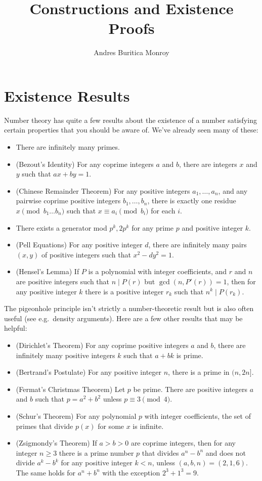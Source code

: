 \documentclass{article}
\title{Constructions and Existence Proofs}
\author{Andres Buritica Monroy}
\date{}
\begin{document}
\maketitle
\section{Existence Results}
Number theory has quite a few results about the existence of a number satisfying
certain properties that you should be aware of. We've already seen many of
these:
\begin{itemize}
  \item There are infinitely many primes.
  \item (Bezout's Identity)
    For any coprime integers $a$ and $b$, there are integers $x$ and $y$ such
    that $ax+by=1$.
  \item (Chinese Remainder Theorem)
    For any positive integers $a_1,\ldots,a_n$, and any pairwise coprime positive
    integers $b_1,\ldots,b_n$, there is exactly one residue $x\pmod {b_1\ldots
    b_n}$ such that $x\equiv a_i\pmod{b_i}$ for each $i$.
  \item There exists a generator mod $p^k,2p^k$ for any prime $p$ and positive
    integer $k$.
  \item (Pell Equations) For any positive integer $d$, there are infinitely many
    pairs $(x,y)$ of positive integers such that $x^2-dy^2=1$.
  \item (Hensel's Lemma) If $P$ is a polynomial with integer coefficients, and
    $r$ and $n$ are positive integers such that $n\mid P(r)$ but
    $\gcd(n,P'(r))=1$, then for any positive integer $k$ there is a positive
    integer $r_k$ such that $n^k\mid P(r_k)$.
\end{itemize}
The pigeonhole principle isn't strictly a number-theoretic result but is also
often useful (see e.g.\ density arguments).
Here are a few other results that may be helpful:
\begin{itemize}
  \item (Dirichlet's Theorem)
    For any coprime positive integers $a$ and $b$, there are infinitely many
    positive integers $k$ such that $a+bk$ is prime.
  \item (Bertrand's Postulate)
    For any positive integer $n$, there is a prime in $(n,2n]$. %
  \item (Fermat's Christmas Theorem) Let $p$ be prime. There are positive
    integers $a$ and $b$ such that $p=a^2+b^2$ unless $p\equiv 3\pmod 4$.
  \item (Schur's Theorem) For any polynomial $p$ with integer coefficients, the
    set of primes that divide $p(x)$ for some $x$ is infinite.
  \item (Zsigmondy's Theorem) If $a>b>0$ are coprime integers, then for any
    integer $n\ge 3$ there is a prime number $p$ that divides $a^n-b^n$ and does
    not divide $a^k-b^k$ for any positive integer $k<n$, unless
    $(a,b,n)=(2,1,6)$. The same holds for $a^n+b^n$ with the exception
    $2^3+1^3=9$.
\end{itemize}
\end{document}

